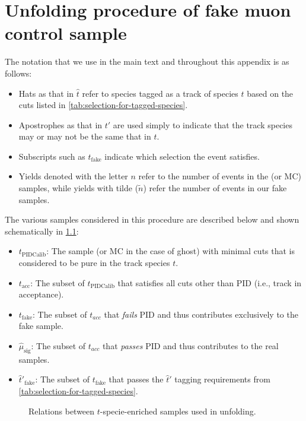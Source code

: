 \chapter{Unfolding procedure of fake muon control sample}
\label{appx:unfold-tech}

The notation that we use in the main text and throughout this appendix is as follows:

\begin{itemize}
\item Hats as that in $\hat{t}$ refer to species tagged as a track of species $t$ based
  on the cuts listed in \cref{tab:selection-for-tagged-species}.
\item Apostrophes as that in $t'$ are used simply to indicate that the track species may or may not
  be the same that in $t$.
\item Subscripts such as $t_\text{fake}$ indicate which selection the event satisfies.
\item Yields denoted with the letter $n$ refer to the number of events in the \pidcalib (or MC) samples, while
  yields with tilde ($\tilde{n}$) refer the number of events in our fake \muon samples.
\end{itemize}

The various samples considered in this procedure are described below and shown
schematically in \cref{fig:relation-unfolding-sets}:

\begin{itemize}
\item $t_\text{PIDCalib}$: The \pidcalib sample (or MC in the case of ghost) with minimal cuts
  that is considered to be pure in the track species $t$.
\item $t_\text{acc}$: The subset of $t_\text{PIDCalib}$ that satisfies all \muon
cuts other than PID (i.e., track in \muon acceptance).
\item $t_\text{fake}$: The subset of $t_{acc}$ that \emph{fails} \muon PID and thus contributes exclusively to the fake \muon sample.
\item $\hat{\mu}_\text{sig}$: The subset of $t_{acc}$ that \emph{passes} \muon PID
  and thus contributes to the real \muon samples.
\item $\hat{t}'_\text{fake}$: The subset of $t_\text{fake}$ that passes the $\hat{t}'$ tagging requirements
  from \cref{tab:selection-for-tagged-species}.
\end{itemize}

\begin{figure}[ht]
    \centering
    \resizebox{0.9\columnwidth}{!}{
        
    }
    \caption{Relations between $t$-specie-enriched samples used in unfolding.}
    \label{fig:relation-unfolding-sets}
\end{figure}


